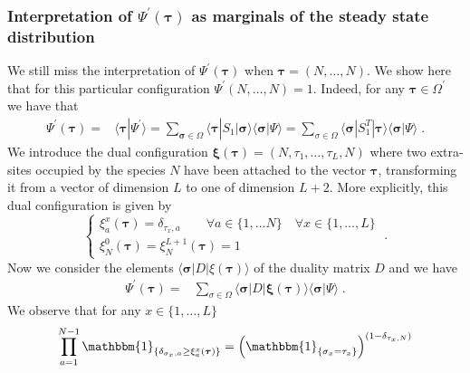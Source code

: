 \documentclass[10pt]{article}
\numberwithin{equation}{section}
\numberwithin{equation}{subsection}
\newcommand{\dt}{\;.}
\begin{document}
\subsubsection{Interpretation of $\Psi^{'}(\bm{\tau})$ as marginals of the steady state distribution}\label{subsection-interpretationPSIp}
We still miss the interpretation of $\Psi^{'}(\bm{\tau})$ when  $\bm{\tau}= (N,\ldots,N)$. We show here that for this particular configuration
$\Psi^{'}(N,\ldots,N) =1$. Indeed, for any $\bm{\tau}\in \Omega^{'}$ we have that 
\begin{align}
	\Psi^{'}(\bm{\tau})=&\langle\bm{\tau}|\Psi^{'}\rangle=\sum_{\bm{\sigma}\in \Omega}\langle \bm{\tau}|S_{1}|\bm{\sigma}\rangle\langle \bm{\sigma}|\Psi\rangle=\sum_{\sigma\in \Omega}\langle \bm{\sigma}|S_{1}^{T}|\bm{\tau}\rangle\langle \bm{\sigma}|\Psi\rangle\dt
\end{align}
We introduce the dual configuration $\bm{\xi}(\bm{\tau})=(N,\tau_{1},\ldots,\tau_{L},N)$ where two extra-sites occupied by the species $N$ have been attached to the vector $\bm{\tau}$, transforming it from a vector of dimension $L$ to one of dimension $L+2$. More explicitly, this dual configuration is given by
\begin{equation}
	\begin{cases}
	\xi_{a}^{x}(\bm{\tau})= \delta_{\tau_{x},a}\qquad \forall a\in \{1,\ldots N\}\quad \forall x\in \{1,\ldots,L\}\\
	\xi_{N}^{0}(\bm{\tau})=\xi_{N}^{L+1}(\bm{\tau})=1
\end{cases}\dt
\end{equation} Now we consider the elements $\langle\bm{\sigma}|D|\xi(\bm{\tau})\rangle$ of the duality matrix $D$ and we have
\begin{align}\label{useful-InInterpretation}
	\Psi^{'}(\bm{\tau})=&\sum_{\sigma\in \Omega}\langle \bm{\sigma}|D|\bm{\xi}(\bm{\tau})\rangle\langle \bm{\sigma}|\Psi\rangle\dt
\end{align}
We observe that for any $x\in \{1,\ldots,L\}$
\begin{equation}
	\prod_{a=1}^{N-1}\mathbbm{1}_{\{\delta_{\sigma_{x},a}\geq\xi_{a}^{x}(\bm{\tau})\}}=\left(\mathbbm{1}_{\{\sigma_{x}=\tau_{x}\}}\right)^{(1-\delta_{\tau_{x},N})}%
\end{equation}
\end{document}
